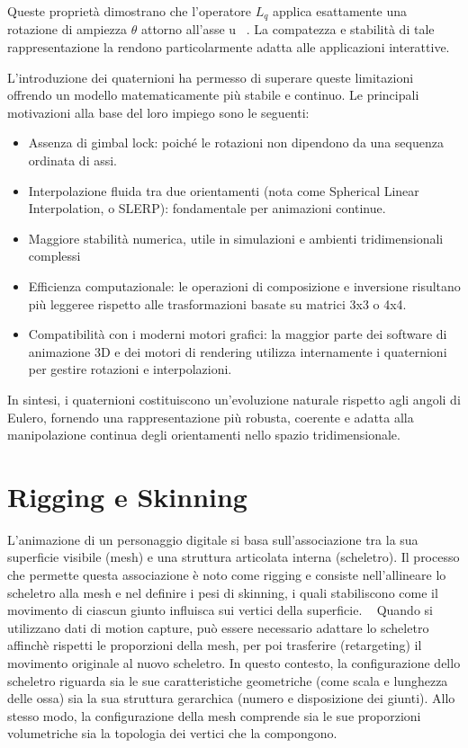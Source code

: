 \begin{itemize}
    Queste proprietà dimostrano che l'operatore ${L_q}$ applica esattamente una rotazione di ampiezza $\theta$ attorno all'asse u ~\cite{quater3}. La compatezza e stabilità di tale rappresentazione la rendono particolarmente adatta alle applicazioni interattive.

    L'introduzione dei quaternioni ha permesso di superare queste limitazioni offrendo un modello matematicamente più stabile e continuo. Le principali motivazioni alla base del loro impiego sono le seguenti:

    \begin{itemize}
        \item Assenza di gimbal lock: poiché le rotazioni non dipendono da una sequenza ordinata di assi.
        \item Interpolazione fluida tra due orientamenti (nota come Spherical Linear Interpolation, o SLERP): fondamentale per animazioni continue.
        \item Maggiore stabilità numerica, utile in simulazioni e ambienti tridimensionali complessi
        \item Efficienza computazionale: le operazioni di composizione e inversione risultano più leggeree rispetto alle trasformazioni basate su matrici 3x3 o 4x4.
        \item Compatibilità con i moderni motori grafici: la maggior parte dei software di animazione 3D e dei motori di rendering utilizza internamente i quaternioni per gestire rotazioni e interpolazioni.
    \end{itemize}

    In sintesi, i quaternioni costituiscono un'evoluzione naturale rispetto agli angoli di Eulero, fornendo una rappresentazione più robusta, coerente e adatta alla manipolazione continua degli orientamenti nello spazio tridimensionale.

\section{Rigging e Skinning}

L'animazione di un personaggio digitale si basa sull'associazione tra la sua superficie visibile (mesh) e una struttura articolata interna (scheletro). Il processo che permette questa associazione è noto come rigging e consiste nell'allineare lo scheletro alla mesh e nel definire i pesi di skinning, i quali stabiliscono come il movimento di ciascun giunto influisca sui vertici della superficie. ~\cite{asmr}
Quando si utilizzano dati di motion capture, può essere necessario adattare lo scheletro affinchè rispetti le proporzioni della mesh, per poi trasferire (retargeting) il movimento originale al nuovo scheletro.
In questo contesto, la configurazione dello scheletro riguarda sia le sue caratteristiche geometriche (come scala e lunghezza delle ossa) sia la sua struttura gerarchica (numero e disposizione dei giunti). Allo stesso modo, la configurazione della mesh comprende sia le sue proporzioni volumetriche sia la topologia dei vertici che la compongono.


\end{itemize}
